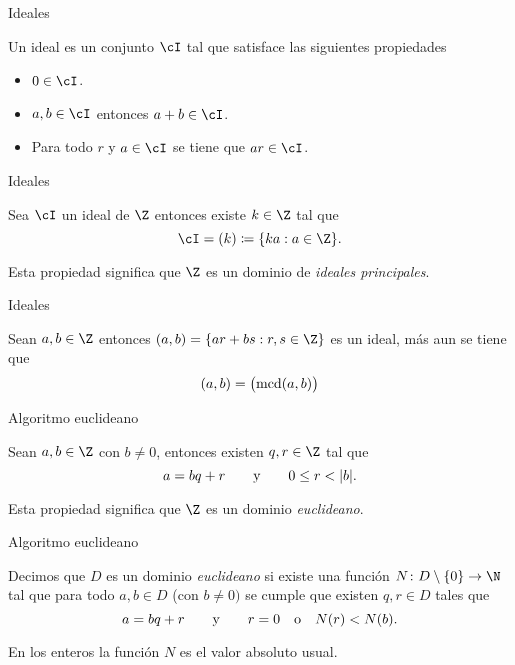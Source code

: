 \begin{frame}{Ideales}
  \begin{definition}
  Un ideal es un conjunto $\cI$ tal que satisface las siguientes propiedades
  \begin{itemize}[<+->]
    \item $0 \in \cI$.
    
    \item $a,b \in \cI$ entonces $a + b \in \cI$.
    
    \item Para todo $r$ y $a \in \cI$ se tiene que $ar \in \cI$.
  \end{itemize}
  \end{definition}
\end{frame}

\begin{frame}{Ideales}
  \begin{theorem}
    Sea $\cI$ un ideal de $\Z$ entonces existe $k \in \Z$ tal que
    \[
      \cI = (k) \coloneqq \{ka : a \in \Z\}.
    \]
  \end{theorem}

  \pause\bigskip
  Esta propiedad significa que $\Z$ es un dominio de \emph{ideales principales}.
\end{frame}


\begin{frame}{Ideales}
  \begin{proposition}
    Sean $a,b \in \Z$ entonces $(a,b) = \{ ar + bs : r,s \in \Z \}$ es un ideal, más aun se tiene que
    \[
      (a,b) = \bigl(\operatorname{mcd}(a,b)\bigr)
    \]
  \end{proposition}
\end{frame}


\begin{frame}{Algoritmo euclideano}
  \begin{theorem}
    Sean $a,b \in \Z$ con $b \neq 0$, entonces existen $q,r \in \Z$ tal que
    \[
      a = bq+r
      \qquad\text{y}\qquad
      0 \leq r < \mathopen|b\mathclose|.
    \]
  \end{theorem}

  \pause\bigskip
  Esta propiedad significa que $\Z$ es un dominio \emph{euclideano}.
\end{frame}


\begin{frame}{Algoritmo euclideano}
  \begin{definition}
    Decimos que $D$ es un dominio \emph{euclideano} si existe una función $N\colon D \sm \{0\} \to \N$ tal que para todo $a,b \in D$ (con $b \neq 0)$ se cumple que existen $q,r \in D$ tales que
    \[
      a = bq + r \qquad\text{y}\qquad
      r = 0 \quad\text{o}\quad N(r) < N(b).
    \]
  \end{definition}

  \pause\bigskip
  En los enteros la función $N$ es el valor absoluto usual.
\end{frame}



